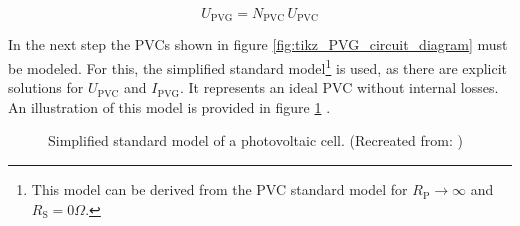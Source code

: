 \begin{center}
	\begin{equation} \label{eq:u_pvg_sum_of_pvc}
		U_{\mathrm{PVG}} = N_{\mathrm{PVC}} \, U_{\mathrm{PVC}}
	\end{equation}
\end{center}

In the next step the PVCs shown in figure \ref{fig:tikz_PVG_circuit_diagram} must be modeled. For this, the simplified standard model\footnote{This model can be derived from the PVC standard model for $R_{\mathrm{P}} \to \infty$ and $R_{\mathrm{S}} = 0\Omega$.} is used, as there are explicit solutions for $U_{\mathrm{PVC}}$ and $I_{\mathrm{PVG}}$. It represents an ideal PVC without internal losses. An illustration of this model is provided in figure \ref{fig:tikz_PVC_simplified} \cite{Mertens:2015, Wagner:2018}.
\begin{figure}[h!]
	\centering
	
	\caption{Simplified standard model of a photovoltaic cell. (Recreated from: \cite{Mertens:2015, Wagner:2018})}
	\label{fig:tikz_PVC_simplified}
\end{figure}

